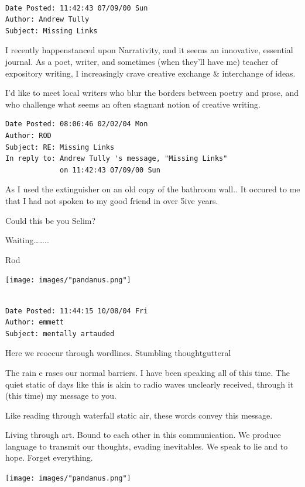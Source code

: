 \documentclass[
]{memoir}
\begin{document}
\begin{verbatim}

Date Posted: 11:42:43 07/09/00 Sun
Author: Andrew Tully
Subject: Missing Links
\end{verbatim}

I recently happenstanced upon Narrativity, and it seems an innovative,
essential journal. As a poet, writer, and sometimes (when they'll have
me) teacher of expository writing, I increasingly crave creative
exchange \& interchange of ideas.

I'd like to meet local writers who blur the borders between poetry and
prose, and who challenge what seems an often stagnant notion of creative
writing.

\begin{verbatim}
Date Posted: 08:06:46 02/02/04 Mon
Author: ROD
Subject: RE: Missing Links
In reply to: Andrew Tully 's message, "Missing Links" 
             on 11:42:43 07/09/00 Sun
\end{verbatim}

As I used the extinguisher on an old copy of the bathroom wall.. It
occured to me that I had not spoken to my good friend in over 5ive
years.

Could this be you Selim?

Waiting\ldots{}\ldots{}..

Rod

\begin{center}\texttt{[image: images/"pandanus.png"]}\end{center}

\begin{verbatim}

Date Posted: 11:44:15 10/08/04 Fri
Author: emmett
Subject: mentally artauded
\end{verbatim}

Here we reoccur through wordlines. Stumbling thoughtgutteral

The rain e rases our normal barriers. I have been speaking all of this
time. The quiet static of days like this is akin to radio waves
unclearly received, through it (this time) my message to you.

Like reading through waterfall static air, these words convey this
message.

Living through art. Bound to each other in this communication. We
produce language to transmit our thoughts, evading inevitables. We speak
to lie and to hope. Forget everything.

\begin{center}\texttt{[image: images/"pandanus.png"]}\end{center}
\end{document}
